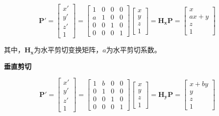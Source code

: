 \documentclass[cn, blue, normal, 12pt]{elegantnote}
\begin{document}
\begin{equation}
    \bm{P'}=\left[
        \begin{array}{c}
            x' \\ y' \\ z' \\ 1
        \end{array}
    \right]=\left[
        \begin{array}{cccc}
            1 & 0 & 0 & 0 \\
            a & 1 & 0 & 0 \\
            0 & 0 & 1 & 0 \\
            0 & 0 & 0 & 1
        \end{array}
    \right]\left[
        \begin{array}{c}
            x \\ y \\ z \\ 1
        \end{array}
    \right]=\bm{H_{x}P}=\left[
        \begin{array}{c}
            x \\ ax+y \\ z \\ 1
        \end{array}
    \right]
\end{equation}

其中，$\bm{H_{x}}$为水平剪切变换矩阵，$a$为水平剪切系数。

\textbf{垂直剪切}

\begin{equation}
    \bm{P'}=\left[
        \begin{array}{c}
            x' \\ y' \\ z' \\ 1
        \end{array}
    \right]=\left[
        \begin{array}{cccc}
            1 & b & 0 & 0 \\
            0 & 1 & 0 & 0 \\
            0 & 0 & 1 & 0 \\
            0 & 0 & 0 & 1
        \end{array}
    \right]\left[
        \begin{array}{c}
            x \\ y \\ z \\ 1
        \end{array}
    \right]=\bm{H_{y}P}=\left[
        \begin{array}{c}
            x+by \\ y \\ z \\ 1
        \end{array}
    \right]
\end{equation}
\end{document}
